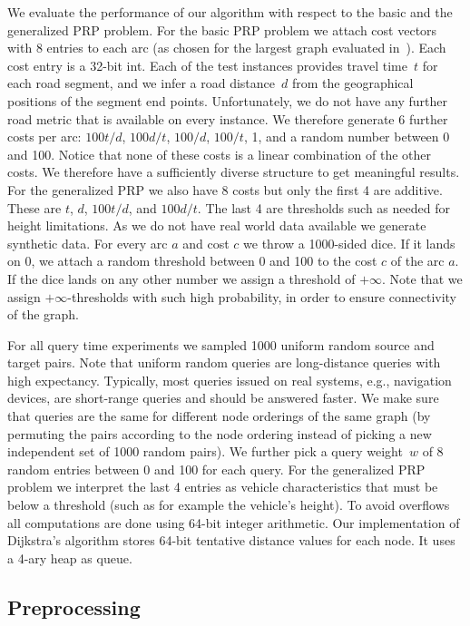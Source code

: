 \documentclass{sig-alternate}
\newcommand{\arccost}{\ensuremath{c}}
\newcommand{\queryweight}{\ensuremath{w}}
\begin{document}
We evaluate the performance of our algorithm with respect to the basic and the generalized PRP problem.
For the basic PRP problem we attach cost vectors with 8 entries to each
arc (as chosen for the largest graph evaluated
in~\cite{fns-opca-14}). Each cost entry is a 32-bit int. 
Each of the test instances provides travel time~$t$ for each road segment, and we infer a road distance~$d$ from the geographical positions of the segment end points.
Unfortunately, we do not have any further road metric that is available on every instance.
We therefore generate 6 further costs per arc: $100t/d$, $100d/t$, $100/d$, $100/t$, 1, and a random number between 0 and 100. 
Notice that none of these costs is a linear combination of the other costs.
We therefore have a sufficiently diverse structure to get meaningful results. 
For the generalized PRP we also have 8 costs but only the first 4 are additive. 
These are $t$, $d$, $100t/d$, and $100d/t$. 
The last 4 are thresholds such as needed for height limitations.
As we do not have real world data available we generate synthetic data.
For every arc $a$ and cost $c$ we throw a 1000-sided dice. 
If it lands on 0, we attach a random threshold between 0 and 100 to the cost $\arccost$ of the arc $a$. 
If the dice lands on any other number we assign a threshold of $+\infty$.
Note that we assign $+\infty$-thresholds with such high probability, in order to ensure connectivity of the graph. 

For all query time experiments we sampled 1000 uniform random source and target pairs. 
Note that uniform random queries are long-distance queries with high expectancy. Typically, most queries issued on real systems, e.g., navigation devices, are short-range queries and should be answered faster.
We make sure that queries are the same for different node orderings of the same graph (by permuting the pairs according
to the node ordering instead of picking a new independent set of 1000
random pairs). We further pick a query weight~$\queryweight$ of 8 random entries between 0 and
100 for each query. For the generalized PRP problem we interpret the last 4 entries as vehicle characteristics that must be below a threshold (such as for example the vehicle's height).
To avoid overflows all computations are done using 64-bit integer arithmetic. Our implementation of Dijkstra's algorithm stores 64-bit tentative distance values for each node.
It uses a 4-ary heap as queue.

\subsection{Preprocessing}
\end{document}
